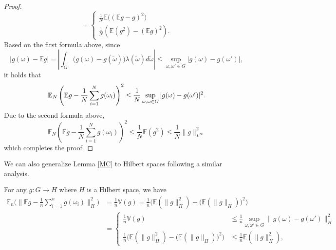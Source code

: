 \begin{proof}
\begin{equation}
      =
           \left\{
             \begin{aligned}
            \frac{1}{N}\mathbb{E}\big ((\mathbb{E} g-g)^2\big )\\
            \frac{1}{N}(\mathbb{E}(g^2) - (\mathbb{E} g)^2).
            \end{aligned}
    \right.
  \end{equation}
Based on the first formula above, since
$$
|g(\omega) - \mathbb{E} g|=|\int_G \big (g(\omega) - g(\tilde \omega) \big )\lambda(\tilde \omega)d\tilde \omega|\le \sup_{\omega, \omega'\in G} |g(\omega) - g(\omega')|,
$$
it holds that
 \begin{equation} 
 \mathbb{E}_N\left(\mathbb{E} g-
      {1\over N }\sum_{i=1}^Ng(\omega_i)\right)^2 
            \le\frac{1}{N} \sup_{\omega, \omega\in G} |g(\omega) - g(\omega')|^2.
  \end{equation}
Due to the second formula above,  
 \begin{equation}
    \label{eqn}
 \mathbb{E}_N\left(\mathbb{E} g-
      \frac1N\sum_{i=1}^Ng(\omega_i)\right)^2  
            \le\frac{1}{N} \mathbb E(g^2)\le\frac{1}{N}\|g\|^2_{L^\infty}
  \end{equation}
which completes the proof.
\end{proof}

We can also generalize Lemma \ref{MC} to Hilbert spaces following a similar analysis.

\begin{lemma}    
For any $g: G\rightarrow H$ where $H$ is a Hilbert space, we have
  \begin{equation}
  \begin{split}
    \mathbb{E}_n\Big(\|\mathbb{E}g-\frac1n\sum_{i=1}^n
    g(\omega_i)\|_H^2\Big)
    &=\frac{1}{n}\mathbb{V}(g)=\frac{1}{n}\Big(\mathbb{E}(\|g\|_H^2) - \big (\mathbb{E}(\|g\|_H)\big )^2\Big)
    \\
    &=
    \left\{
             \begin{aligned}
    \frac{1}{n}\mathbb{V}(g)
   & \le\frac{1}{n} \sup_{\omega, \omega'\in G} \|g(\omega) - g(\omega')\|_H^2
    \\
\frac{1}{n}\Big(\mathbb{E}(\|g\|_H^2) - \big (\mathbb{E}(\|g\|_H)\big )^2\Big)
&\le\frac{1}{n} \mathbb E(\|g\|_H^2),
\end{aligned}
\right.
\end{split}
  \end{equation} 
\end{lemma}

